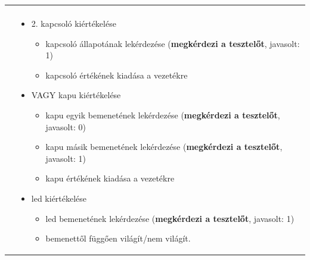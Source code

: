 \begin{longtable}{| l | p{12cm} |}
\begin{itemize}
\begin{itemize}
\begin{itemize}
\end{itemize}
\end{itemize}
\end{itemize}
\tabularnewline
& 

\begin{itemize}
\renewcommand{\labelitemi}{*}
\renewcommand{\labelitemii}{$\cdot$}
\setlength{\itemsep}{0cm}%
\setlength{\parskip}{0cm}%
\setlength{\itemindent}{1.5em}%

	\item 2. kapcsoló kiértékelése
	\begin{itemize}
	\setlength{\itemsep}{0cm}%
	\setlength{\parskip}{0cm}%
	\setlength{\itemindent}{1em}%
		\item kapcsoló állapotának lekérdezése (\textbf{megkérdezi a tesztelőt}, javasolt: 1)
		\item kapcsoló értékének kiadása a vezetékre
	\end{itemize}
	
	\item VAGY kapu kiértékelése
	\begin{itemize}
	\setlength{\itemsep}{0cm}%
	\setlength{\parskip}{0cm}%
	\setlength{\itemindent}{1em}%
		\item kapu egyik bemenetének lekérdezése (\textbf{megkérdezi a tesztelőt}, javasolt: 0)
		\item kapu másik bemenetének lekérdezése (\textbf{megkérdezi a tesztelőt}, javasolt: 1)
	\item kapu értékének kiadása a vezetékre
	\end{itemize}
	\item led kiértékelése
	\begin{itemize}
	\setlength{\itemsep}{0cm}%
	\setlength{\parskip}{0cm}%
	\setlength{\itemindent}{1em}%
		\item led bemenetének lekérdezése (\textbf{megkérdezi a tesztelőt}, javasolt: 1)
		\item bemenettől függően világít/nem világít.
	\end{itemize}
\end{itemize}


\end{longtable}
